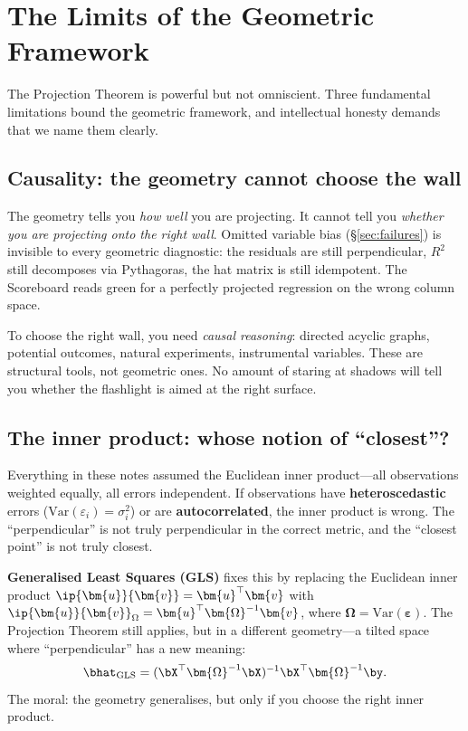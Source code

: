 \section{The Limits of the Geometric Framework}\label{sec:limits}

The Projection Theorem is powerful but not omniscient.
Three fundamental limitations bound the geometric framework, and
intellectual honesty demands that we name them clearly.

\subsection{Causality: the geometry cannot choose the wall}

The geometry tells you \emph{how well} you are projecting.
It cannot tell you \emph{whether you are projecting onto the right wall}.
Omitted variable bias (\S\ref{sec:failures}) is invisible to every
geometric diagnostic: the residuals are still perpendicular, $R^2$ still
decomposes via Pythagoras, the hat matrix is still idempotent.
The Scoreboard reads green for a perfectly projected regression on the
wrong column space.

To choose the right wall, you need \emph{causal reasoning}: directed
acyclic graphs, potential outcomes, natural experiments, instrumental
variables. These are structural tools, not geometric ones.
No amount of staring at shadows will tell you whether the flashlight
is aimed at the right surface.

\subsection{The inner product: whose notion of ``closest''?}

Everything in these notes assumed the Euclidean inner product---all
observations weighted equally, all errors independent.
If observations have \textbf{heteroscedastic} errors
($\text{Var}(\varepsilon_i) = \sigma_i^2$) or are
\textbf{autocorrelated},
the inner product is wrong.
The ``perpendicular'' is not truly perpendicular in the correct metric,
and the ``closest point'' is not truly closest.

\textbf{Generalised Least Squares (GLS)} fixes this by replacing the
Euclidean inner product $\ip{\bm{u}}{\bm{v}}=\bm{u}^\top\bm{v}$ with
$\ip{\bm{u}}{\bm{v}}_\Omega = \bm{u}^\top\bm{\Omega}^{-1}\bm{v}$,
where $\bm{\Omega} = \text{Var}(\bm{\varepsilon})$.
The Projection Theorem still applies, but in a different geometry---a
tilted space where ``perpendicular'' has a new meaning:
\[
  \bhat_{\text{GLS}}
  = (\bX^\top\bm{\Omega}^{-1}\bX)^{-1}\bX^\top\bm{\Omega}^{-1}\by.
\]
The moral: the geometry generalises, but only if you choose the right
inner product.

